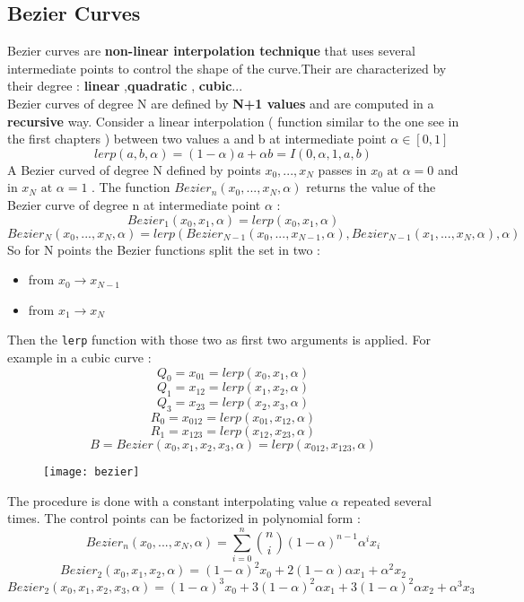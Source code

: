 \subsection{Bezier Curves}
Bezier curves are \textbf{non-linear interpolation technique} that uses several intermediate points to control the shape of the curve.Their are characterized by their degree : \textbf{linear} ,\textbf{quadratic} , \textbf{cubic}...\\
Bezier curves of degree N are defined by \textbf{N+1 values} and are computed in a \textbf{recursive} way. Consider a  linear interpolation ( function similar to the one see in the first chapters ) between two values a and b at intermediate point $\alpha \in [0,1]$ $$ lerp(a,b,\alpha )=  (1-\alpha)a+\alpha b = I(0,\alpha,1,a,b )$$
A Bezier curved of degree N defined by points $x_0,...,x_N$ passes in $x_0 \text{ at } \alpha =0 $ and in $x_N \text{ at } \alpha =1$ . The function $Bezier_n(x_0,...,x_N,\alpha)$ returns the value of the Bezier curve of degree n at intermediate point $\alpha$ :
\[
\boxed{Bezier_1(x_0,x_1,\alpha)=lerp(x_0,x_1,\alpha)}
\]
\[
\boxed{Bezier_N(x_0,...,x_N,\alpha)= lerp(Bezier_{N-1}(x_0,...,x_{N-1},\alpha),Bezier_{N-1}(x_1,...,x_{N},\alpha),\alpha) }
\]
So for N points the Bezier functions split the set in two :
\begin{itemize}
\item from $x_0 \to x_{N-1}$
\item from $x_1 \to x_{N}$ 
\end{itemize}
Then the \texttt{lerp} function with those two as first two arguments is applied.
For example in a cubic curve : 
$$ Q_0=x_{01} = lerp(x_0,x_1,\alpha)$$
$$ Q_1=x_{12} = lerp(x_1,x_2,\alpha)$$
$$ Q_3=x_{23} = lerp(x_2,x_3,\alpha)$$
$$ R_0=x_{012} = lerp(x_{01},x_{12},\alpha)$$
$$ R_1=x_{123} = lerp(x_{12},x_{23},\alpha)$$
$$ B=Bezier(x_0,x_1,x_2,x_3,\alpha) = lerp(x_{012},x_{123},\alpha)$$
 \begin{figure}[H]
 \centering
 \texttt{[image: bezier]} 
 \end{figure}
The procedure is done with a constant interpolating value $\alpha$ repeated several times.
The control points can be factorized in polynomial form :
$$ Bezier_n(x_0,...,x_N, \alpha) = \sum\limits_{i=0}^{n} \binom{n}{i}(1-\alpha)^{n-1}\alpha^ix_i $$
\[
\boxed{Bezier_2(x_0,x_1,x_2,\alpha) = (1-\alpha)^2x_0+2(1-\alpha)\alpha x_1+\alpha^2 x_2} 
\]
\[
\boxed{Bezier_2(x_0,x_1,x_2,x_3,\alpha) = (1-\alpha)^3x_0+3(1-\alpha)^2 \alpha x_1+3(1-\alpha)^2 \alpha x_2+\alpha^3 x_3} 
\]

